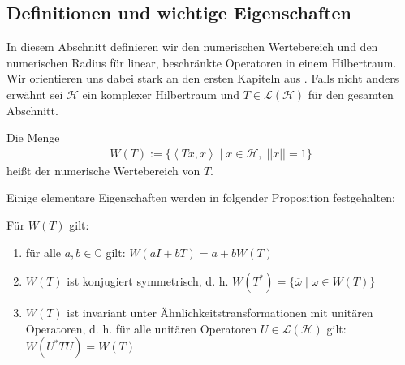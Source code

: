 \subsection{Definitionen und wichtige Eigenschaften}
In diesem Abschnitt definieren wir den numerischen Wertebereich und den numerischen Radius für linear, beschränkte Operatoren in einem Hilbertraum. Wir orientieren uns dabei stark an den ersten Kapiteln aus \parencite[][Kapitel 1,2]{gustafson1997numerical}. Falls nicht anders erwähnt sei $\mathcal{H}$ ein komplexer Hilbertraum und $ T \in \mathcal{L} (\mathcal{H}) $ für den gesamten Abschnitt.

\begin{definition}
	 Die Menge 
	\begin{align*}
		W(T) := \{ \left< Tx,x \right> \; | \; x \in \mathcal{H},\; ||x||=1 \}
	\end{align*}
	heißt der numerische Wertebereich von $T$.
\end{definition}

Einige elementare Eigenschaften werden in folgender Proposition festgehalten:

\begin{prop} \label{prop:properties_numran}
	Für $W(T)$ gilt:
	\begin{enumerate}[label=(\roman*)]
		\item \label{prop:prop_numran_lin} für alle $a , b \in \mathbb{C}$ gilt: $W( aI + b T) = a + b W(T)$
		\item $W(T)$ ist konjugiert symmetrisch, d. h. $W(T^*) =  \{\overline{\omega} \; | \; \omega \in W(T)\}$
		\item $W(T)$ ist invariant unter Ähnlichkeitstransformationen mit unitären Operatoren, d. h. für alle unitären Operatoren $U \in \mathcal{L}(\mathcal{H})$ gilt: $W(U^*TU)=W(T)$
	\end{enumerate}
\end{prop}

